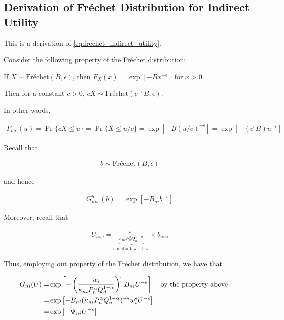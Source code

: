 \documentclass[10pt]{article}
\begin{document}

\subsection{Derivation of Fréchet Distribution for Indirect Utility}
\label{sec:frechet_indirect_utility}

This is a derivation of \eqref{eq:frechet_indirect_utility}.

Consider the following property of 
the Fréchet distribution:

\begin{notes}
    If $X \sim \text{Fréchet}(B, \epsilon)$, then $F_X(x)=\exp \left[-B x^{-\epsilon}\right]$ for $x>0$.

    Then for a constant $c>0$, $cX \sim \text{Fréchet}\left(c^{-\epsilon} B, \epsilon\right)$.
    
    In other words, 

    \begin{align}
        F_{c X}(u)=\operatorname{Pr}\{c X \leq u\}=\operatorname{Pr}\{X \leq u / c\}=\exp \left[-B(u / c)^{-\epsilon}\right]=\exp \left[-\left(c^{\epsilon} B\right) u^{-\epsilon}\right]
    \end{align}

\end{notes}


Recall that

\begin{align}
    b \sim \text{Fréchet}(B, \epsilon)
\end{align}

and hence

\begin{align}
    G^b_{n i \omega}(b)=\exp \left[-B_{n i} b^{-\epsilon}\right]
\end{align}

Moreover, recall that

\begin{align}
    U_{n i \omega}=\underbrace{\frac{w_i}{\kappa_{n i} P_n^\alpha Q_n^{1-\alpha}}}_{\text {constant w.r.t. } \omega} \times b_{n i \omega}
\end{align}

Thus, employing out property of the Fréchet distribution, we have that

\begin{align}
    G_{n i}(U)=&\exp \left[-\left(\frac{w_i}{\kappa_{n i} P_n^\alpha Q_n^{1-\alpha}}\right)^{\epsilon} B_{n i} U^{-\epsilon}\right] && \parbox[t]{4cm}{\raggedright by the property above} \\
    =&\exp \left[-B_{ni} (\kappa_{n i} P_n^\alpha Q_n^{1-\alpha})^{-\epsilon} w_i^\epsilon U^{-\epsilon}\right] \\
    =&\exp \left[- \Psi_{n i} U^{-\epsilon}\right]
\end{align}
\end{document}
